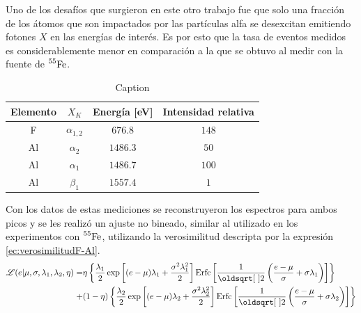 Uno de los desafíos que surgieron en este otro trabajo fue que solo una fracción de los átomos que son impactados por las partículas alfa se desexcitan emitiendo fotones $X$ en las energías de interés. Es por esto que la tasa de eventos medidos es considerablemente menor en comparación a la que se obtuvo al medir con la fuente de $\prescript{55}{}{\mbox{Fe}}$.
\begin{table}[h]
\centering
\begin{tabular}{@{}cccc@{}}
\toprule
Elemento    &   $X_{K}$         &   Energía [eV]    &   Intensidad relativa \\ \hline \hline
F           &   $\alpha_{1,2}$  &   $676.8$         &   $148$               \\
Al          &   $\alpha_{2}$    &   $1486.3$        &   $50$                \\
Al          &   $\alpha_{1}$    &   $1486.7$        &   $100$               \\
Al          &   $\beta_{1}$     &   $1557.4$        &   $1$                 \\ \bottomrule
\end{tabular}
\caption{\footnotesize{Caption}}
\label{tab:EnergiasFluorescenciaFAl}
\end{table}
Con los datos de estas mediciones se reconstruyeron los espectros para ambos picos y se les realizó un ajuste no bineado, similar al utilizado en los experimentos con $\prescript{55}{}{\mbox{Fe}}$, utilizando la verosimilitud descripta por la expresión \eqref{ec:verosimilitudF-Al}.
\begin{align}
    \Lagr(e|\mu,
            \sigma,
            \lambda_{1},
            \lambda_{2},
            \eta)
    = &
    \eta
    \left\{
        \frac{\lambda_{1}}{2}
        \exp\left[
                (e-\mu)\lambda_{1} + \frac{\sigma^{2}\lambda_{1}^{2}}{2}
            \right]
        \mbox{Erfc}
        \left[
            \frac{1}{\sqrt{2}}
            \left(
                \frac{e - \mu}{\sigma}
                +\sigma\lambda_{1}
            \right)
        \right] \right\} \nonumber
        \\
        + &
        (1-\eta)
        \left\{
        \frac{\lambda_{2}}{2}
        \exp
            \left[
                 (e - \mu)\lambda_{2}
                 + \frac{\sigma^{2}\lambda_{2}^{2}}{2}
            \right]
        \mbox{Erfc}
        \left[
            \frac{1}{\sqrt{2}}
            \left(
                \frac{e - \mu}{\sigma}
                +\sigma\lambda_{2}
            \right)
        \right]
    \right\}
        \label{ec:verosimilitudF-Al}
\end{align}
